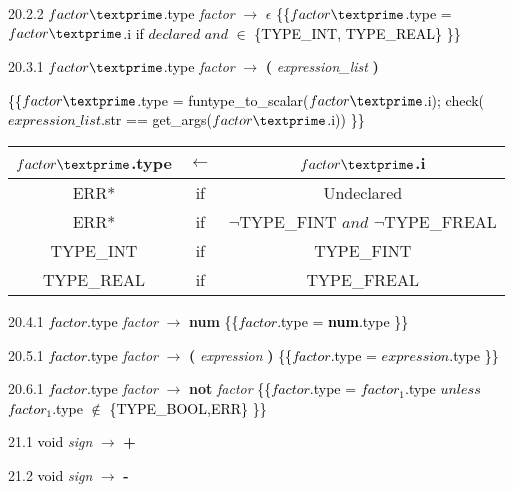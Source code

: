 20.2.2 \textcolor{black}{$factor\textprime$.type} \emph{factor\textprime} $\rightarrow$ $\epsilon$ \textcolor{black}{\{\{$factor\textprime$.type = $factor\textprime$.i if $declared$ $and$ $\in$ \{TYPE\_INT, TYPE\_REAL\} \}\}}

20.3.1 \textcolor{black}{$factor\textprime$.type} \emph{factor\textprime} $\rightarrow$ \textbf{(} \emph{expression\_list} \textbf{)}

\textcolor{black}{\{\{$factor\textprime$.type = funtype_to_scalar($factor\textprime$.i); check($expression\_list$.str == get_args($factor\textprime$.i)) \}\}}

\begin{tabular}[t]{|c|c|c|}
  \hline

  $factor\textprime$.type & \textbf{$\leftarrow$} & $factor\textprime$.i \\

  \hline
  ERR* & if & Undeclared \\
  ERR* & if & $\neg$TYPE\_FINT $and$ $\neg$TYPE\_FREAL \\
  TYPE\_INT & if & TYPE\_FINT \\
  TYPE\_REAL & if & TYPE\_FREAL \\

  \hline

\end{tabular}

20.4.1 \textcolor{black}{$factor$.type} \emph{factor} $\rightarrow$ \textbf{num} \textcolor{black}{\{\{$factor$.type = \textbf{num}.type \}\}}

20.5.1 \textcolor{black}{$factor$.type} \emph{factor} $\rightarrow$ \textbf{(} \emph{expression} \textbf{)} \textcolor{black}{\{\{$factor$.type = $expression$.type \}\}}

20.6.1 \textcolor{black}{$factor$.type} \emph{factor} $\rightarrow$ \textbf{not} \emph{factor} \textcolor{black}{\{\{$factor$.type = $factor_1$.type $unless$ $factor_1$.type $\notin$ \{TYPE\_BOOL,ERR\} \}\}}

21.1 \textcolor{black}{void} \emph{sign} $\rightarrow$ \textbf{+}

21.2 \textcolor{black}{void} \emph{sign} $\rightarrow$ \textbf{-}
